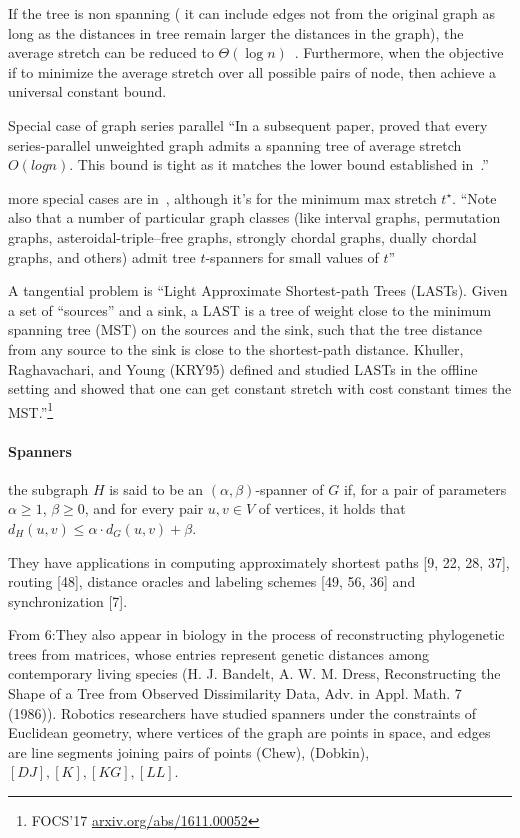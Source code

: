 If the tree is non spanning (\ie{} it can include edges not from the original graph as long as the
distances in tree remain larger the distances in the graph), the average stretch can be reduced to
$\Theta(\log n)$~\autocite{lognMetricBoundConf03}. Furthermore, when the objective if to minimize
the average stretch over all possible pairs of node, then \textcite{constantDistortion07} achieve a
universal constant bound.

Special case of graph
series parallel
\enquote{In a subsequent paper, \textcite{seriesParallel06} proved that every series-parallel
unweighted graph admits a spanning tree of average stretch $O(log n)$. This bound is tight as it
matches the lower bound established in~\autocite{cutsTrees99}.}

more special cases are in~\autocite{specialCase14}, although it's for the minimum max stretch
$t^\star$.
\enquote{Note also that a number of particular graph classes (like interval
graphs, permutation graphs, asteroidal-triple–free graphs, strongly chordal graphs,
dually chordal graphs, and others) admit tree $t$-spanners for small values of $t$}

A tangential problem is \enquote{Light Approximate Shortest-path Trees (LASTs).  Given a set of
“sources” and a sink, a LAST is a tree of weight close to the minimum spanning tree (MST) on the
sources and the sink, such that the tree distance from any source to the sink is close to the
shortest-path distance. Khuller, Raghavachari, and Young (KRY95) defined and studied LASTs in the
offline setting and showed that one can get constant stretch with cost constant times the
MST.}\footnote{FOCS'17 \href{https://arxiv.org/abs/1611.00052}{arxiv.org/abs/1611.00052}}

\paragraph{Spanners}
\label{par:spanners}

the subgraph $H$ is said to be an $(\alpha, \beta)$-spanner of $G$ if, for a pair of parameters
$\alpha \geq 1$, $\beta \geq 0$, and for every pair $u, v \in V$ of vertices, it holds that $d_H(u,
v) \leq \alpha\cdot d_G(u, v)+\beta$.

They have applications in computing approximately shortest
paths [9, 22, 28, 37], routing [48], distance oracles and
labeling schemes [49, 56, 36] and synchronization [7].

From 6:They also appear in biology in the process of reconstructing phylogenetic trees from
matrices, whose entries represent genetic distances among contemporary living species (H. J.
Bandelt, A. W. M. Dress, Reconstructing the Shape of a Tree from Observed Dissimilarity Data, Adv.
in Appl. Math. 7 (1986)). Robotics researchers have studied spanners under the constraints of
Euclidean geometry, where vertices of the graph are points in space, and edges are line segments
joining pairs of points (Chew), (Dobkin), $[DJ], [K], [KG], [LL]$. 

